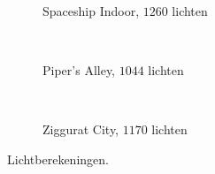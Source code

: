 \begin{figure}[t]
\begin{subfigure}[b]{\textwidth}
  \end{subfigure}\hfill\\
  \begin{minipage}[t]{0.5\textwidth}
  \begin{adjustbox}{minipage=\textwidth, scale=0.55}
    \begin{subfigure}[b]{1.6\textwidth}
      \centering
      \def\svgwidth{\textwidth}
      
      \caption{Spaceship Indoor, $1260$ lichten}
      \vspace{4pt}
      \label{fig:ts-lc-resolution:indoor}
    \end{subfigure}
  \end{adjustbox} \\
  \begin{adjustbox}{minipage=\textwidth, scale=0.55}
    \begin{subfigure}[b]{1.6\textwidth}
      \centering
      \def\svgwidth{\textwidth}
      
      \caption{Piper's Alley, $1044$ lichten}
      \vspace{4pt}
      \label{fig:ts-lc-resolution:alley}
    \end{subfigure}
  \end{adjustbox} \\
  \begin{adjustbox}{minipage=\textwidth, scale=0.55}
    \begin{subfigure}[b]{1.6\textwidth}
      \centering
      \def\svgwidth{\textwidth}
      
      \caption{Ziggurat City, $1170$ lichten}
      \label{fig:ts-lc-resolution:city}
    \end{subfigure}
  \end{adjustbox}
  \caption{\small Lichtberekeningen. }
  \label{fig:ts-lc-resolution}
  \end{minipage}
  \begin{minipage}[t]{0.5\textwidth}
  \begin{adjustbox}{minipage=\textwidth, scale=0.55}

\end{adjustbox}
\end{minipage}
\end{figure}
